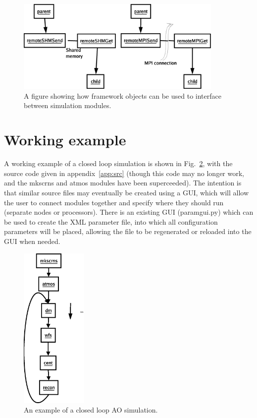 \documentclass{article}
\begin{document}
\begin{figure}
\includegraphics[width=10cm]{pics/baseClassUsage.eps}
\caption{A figure showing how framework objects can be used to
  interface between simulation modules.}
\label{fig:usage}
\end{figure}

\section{Working example}
A working example of a closed loop simulation is shown in
Fig.~\ref{fig:workingexample}, with the source code given in
appendix~\ref{app:src} (though this code may no longer work, and the
mkscrns and atmos modules have been superceeded).  The intention is
that similar source files may eventually be created using a GUI, which
will allow the user to connect modules together and specify where they
should run (separate nodes or processors).  There is an existing GUI
(paramgui.py) which can be used to create the XML parameter file, into
which all configuration parameters will be placed, allowing the file
to be regenerated or reloaded into the GUI when needed.

\begin{figure}
\includegraphics[height=8cm]{pics/simulation.eps}
\caption{An example of a closed loop AO simulation.}
\label{fig:workingexample}
\end{figure}
\end{document}
